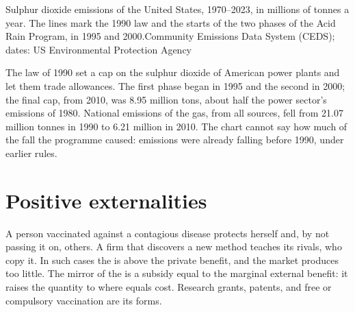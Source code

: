 \begin{omchart}{Sulphur dioxide emissions of the United States, 1970--2023, in millions of tonnes a year. The lines mark the 1990 law and the starts of the two phases of
the Acid Rain Program, in 1995 and 2000.}{Community Emissions Data System (CEDS); dates: US Environmental Protection Agency}
\end{omchart}

\begin{record}
The law of 1990 set a cap on the sulphur dioxide of American power plants and let them trade allowances. The first phase began in 1995 and the second in 2000; the final
cap, from 2010, was 8.95 million tons, about half the power sector's emissions of 1980. National emissions
of the gas, from all sources, fell from 21.07 million tonnes in 1990 to 6.21 million in 2010. The chart cannot say how much of the fall the programme caused: emissions
were already falling before 1990, under earlier rules.
\end{record}

\section{Positive externalities}\label{sec:g11:externalities:positive}

A person vaccinated against a contagious disease protects herself and, by not passing it on, others. A firm that discovers a new method teaches its rivals, who copy it.
In such cases the  is above the private benefit, and the market produces too little. The mirror of the  is a subsidy equal to the marginal
external benefit: it raises the quantity to where  equals cost. Research grants, patents, and free or compulsory vaccination are its forms.

